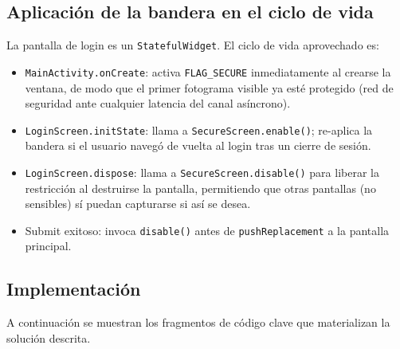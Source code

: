 \documentclass[12pt, a4paper]{article}
\begin{document}
\subsection{Aplicación de la bandera en el ciclo de vida}
La pantalla de login es un \texttt{StatefulWidget}. El ciclo de vida
aprovechado es:

\begin{itemize}
    \item \texttt{MainActivity.onCreate}: activa \texttt{FLAG\_SECURE}
    inmediatamente al crearse la ventana, de modo que el primer fotograma
    visible ya esté protegido (red de seguridad ante cualquier latencia
    del canal asíncrono).
    \item \texttt{LoginScreen.initState}: llama a \texttt{SecureScreen.enable()};
    re-aplica la bandera si el usuario navegó de vuelta al login tras un
    cierre de sesión.
    \item \texttt{LoginScreen.dispose}: llama a \texttt{SecureScreen.disable()}
    para liberar la restricción al destruirse la pantalla, permitiendo
    que otras pantallas (no sensibles) sí puedan capturarse si así se
    desea.
    \item Submit exitoso: invoca \texttt{disable()} antes de
    \texttt{pushReplacement} a la pantalla principal.
\end{itemize}

\subsection{Implementación}

A continuación se muestran los fragmentos de código clave que materializan
la solución descrita.
\end{document}
